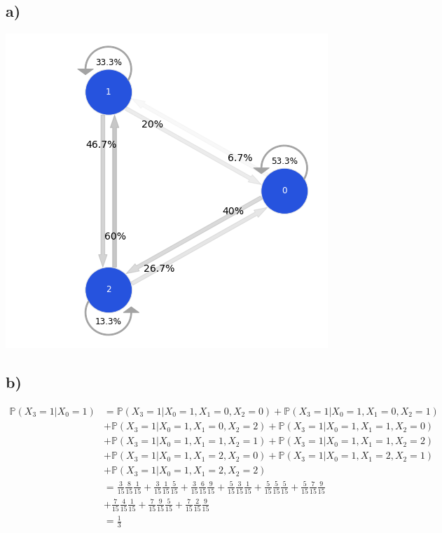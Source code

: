 \documentclass{article}
\begin{document}
\subsection*{a)}
\begin{center}
\includegraphics[scale=0.5]{markov.png}
\end{center}
\subsection*{b)}
\begin{align*}
\mathbb{P}(X_3=1|X_0=1)&=\mathbb{P}(X_3=1|X_0=1,X_1=0,X_2=0)+\mathbb{P}(X_3=1|X_0=1,X_1=0,X_2=1)\\
&+\mathbb{P}(X_3=1|X_0=1,X_1=0,X_2=2)+\mathbb{P}(X_3=1|X_0=1,X_1=1,X_2=0)\\
&+\mathbb{P}(X_3=1|X_0=1,X_1=1,X_2=1)+\mathbb{P}(X_3=1|X_0=1,X_1=1,X_2=2)\\
&+\mathbb{P}(X_3=1|X_0=1,X_1=2,X_2=0)+\mathbb{P}(X_3=1|X_0=1,X_1=2,X_2=1)\\
&+\mathbb{P}(X_3=1|X_0=1,X_1=2,X_2=2)\\
&=\frac{3}{15}\frac{8}{15}\frac{1}{15}+\frac{3}{15}\frac{1}{15}\frac{5}{15}+\frac{3}{15}\frac{6}{15}\frac{9}{15}+\frac{5}{15}\frac{3}{15}\frac{1}{15}+\frac{5}{15}\frac{5}{15}\frac{5}{15}+\frac{5}{15}\frac{7}{15}\frac{9}{15}\\
&+\frac{7}{15}\frac{4}{15}\frac{1}{15}+\frac{7}{15}\frac{9}{15}\frac{5}{15}+\frac{7}{15}\frac{2}{15}\frac{9}{15}\\
&=\frac{1}{3}\\
\end{align*}
\end{document}
